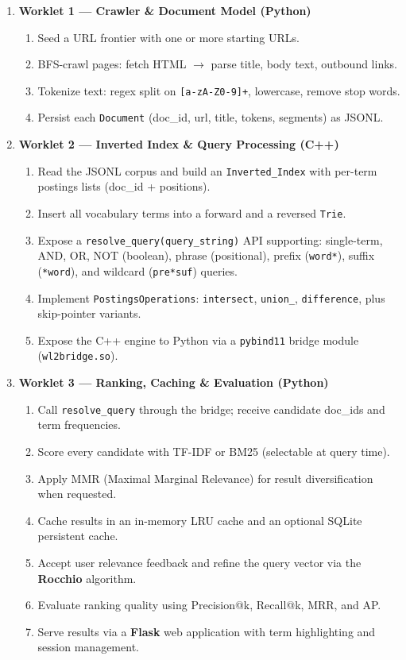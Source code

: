 \documentclass[12pt]{article}
\begin{document}
\begin{enumerate}
    \item \textbf{Worklet 1 --- Crawler \& Document Model (Python)}
    \begin{enumerate}[label=\alph*.]
        \item Seed a URL frontier with one or more starting URLs.
        \item BFS-crawl pages: fetch HTML $\rightarrow$ parse title, body text, outbound links.
        \item Tokenize text: regex split on \texttt{[a-zA-Z0-9]+}, lowercase, remove stop words.
        \item Persist each \texttt{Document} (doc\_id, url, title, tokens, segments) as JSONL.
    \end{enumerate}

    \item \textbf{Worklet 2 --- Inverted Index \& Query Processing (C++)}
    \begin{enumerate}[label=\alph*.]
        \item Read the JSONL corpus and build an \texttt{Inverted\_Index} with per-term postings lists (doc\_id + positions).
        \item Insert all vocabulary terms into a forward and a reversed \texttt{Trie}.
        \item Expose a \texttt{resolve\_query(query\_string)} API supporting: single-term, AND, OR, NOT (boolean), phrase (positional), prefix (\texttt{word*}), suffix (\texttt{*word}), and wildcard (\texttt{pre*suf}) queries.
        \item Implement \texttt{PostingsOperations}: \texttt{intersect}, \texttt{union\_}, \texttt{difference}, plus skip-pointer variants.
        \item Expose the C++ engine to Python via a \texttt{pybind11} bridge module (\texttt{wl2bridge.so}).
    \end{enumerate}

    \item \textbf{Worklet 3 --- Ranking, Caching \& Evaluation (Python)}
    \begin{enumerate}[label=\alph*.]
        \item Call \texttt{resolve\_query} through the bridge; receive candidate doc\_ids and term frequencies.
        \item Score every candidate with TF-IDF or BM25 (selectable at query time).
        \item Apply MMR (Maximal Marginal Relevance) for result diversification when requested.
        \item Cache results in an in-memory LRU cache and an optional SQLite persistent cache.
        \item Accept user relevance feedback and refine the query vector via the \textbf{Rocchio} algorithm.
        \item Evaluate ranking quality using Precision@k, Recall@k, MRR, and AP.
        \item Serve results via a \textbf{Flask} web application with term highlighting and session management.
    \end{enumerate}
\end{enumerate}
\end{document}
